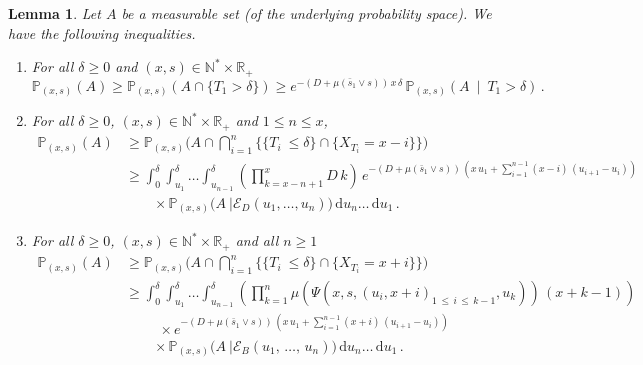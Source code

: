 \documentclass[10pt]{amsart}
\newtheorem{lemm}[theo]{Lemma}\newtheorem{prop}[theo]{Proposition}\newtheorem{coro}[theo]{Corollary}\newtheorem{conj}[theo]{Conjecture}
\theoremstyle{definition}\newtheorem{defi}[theo]{Definition}\newtheorem{rema}[theo]{Remark}\newtheorem{exam}[theo]{Example}\newtheorem{exem}[theo]{Example}\newtheorem{nota}[theo]{Notation}
\newcommand{\PP}{\mathbb{P}}
\newcommand{\RR}{\mathbb{R}}
\newcommand{\NN}{\mathbb{N}}
\newcommand{\clE}{\mathcal{E}}
\newcommand{\dif}{\mathrm{d}}
\newcommand{\1}{\mathbf{1}}
\begin{document}
\begin{lemm}\label{prop.minore.proba.evt}
Let $A$ be a measurable set (of the underlying probability space). We have the following inequalities.
\begin{enumerate}
\item\label{lemmA.9.1} For all $\delta \geq 0$ and $(x,s) \in \NN^*\times \RR_+$
\[
\PP_{(x,s)}(A)\geq \PP_{(x,s)}(A \cap \{T_1 > \delta\}) \geq e^{-(D+\mu(\bar s_1 \vee s))\,x\,\delta}\,\PP_{(x,s)}\left(A \ \middle| \ T_1 > \delta\right)\,.
\]
\item\label{lemmA.9.2} For all $\delta \geq 0$, $(x,s) \in \NN^*\times \RR_+$ and $1\leq n\leq x$,
\begin{align*}
\PP_{(x,s)}(A) & \geq
\PP_{(x,s)}
\Big(A \cap
\bigcap_{i=1}^{n}\Big\{\{T_i\ \leq\delta\} \cap \{ X_{T_i} = x-i \}\Big\}\Big)
\\
&\geq \int_0^{\delta} \int_{u_1}^{\delta}\dots \int_{u_{n-1}}^{\delta}
\left(\prod_{k=x-n+1}^{x}D\,k\right)\, e^{-(D+\mu(\bar s_1 \vee s))\,\left(x\,u_1+
\sum\limits_{i=1}^{n-1}(x-i)\,(u_{i+1}-u_{i})\right)}\,
\\
& \qquad \times
\PP_{(x,s)}
\Big(A \ \Big| \clE_D(u_1,\dots,u_n) \Big)\,
\dif u_{n}\dots\,\dif u_1\,.
\end{align*}

\item\label{lemmA.9.3} For all $\delta \geq 0$, $(x,s) \in \NN^*\times \RR_+$ and all $n\geq 1$
\begin{align*}
\PP_{(x,s)}(A) &
\geq \PP_{(x,s)}
\Big(A \cap
\bigcap_{i=1}^{n}\Big\{\{T_i\ \leq\delta\} \cap \{ X_{T_i} = x+i \}\Big\}\Big)
\\
&\geq \int_0^{\delta} \int_{u_1}^{\delta}\dots \int_{u_{n-1}}^{\delta}
\left(\prod_{k=1}^{n}\mu\left(\Psi(x,s,(u_i,x+i)_{1\,\leq\,i\,\leq\,k-1},u_k)\right)\,(x+k-1)\right)\,
\\
& \hspace{1cm} \times e^{-(D+\mu(\bar s_1 \vee s))\,\left(x\,u_1+
\sum\limits_{i=1}^{n-1}(x+i)\,\left(u_{i+1}-u_{i}\right)\right)}\,
\\
& \qquad \times
\PP_{(x,s)}
\Big(A \ \Big| \clE_B(u_1,\,\dots,\,u_n) \Big)\,
\dif u_{n}\dots\,\dif u_1\,.
\end{align*}
\end{enumerate}
\end{lemm}
\end{document}
